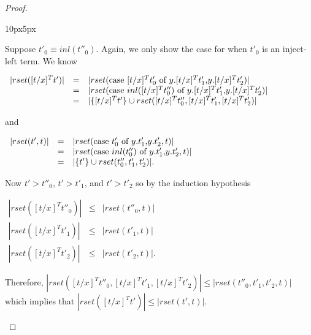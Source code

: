 \begin{proof}
\begin{changemargin}{10px}{5px}
\begin{itemize}
  Suppose $t'_0 \equiv inl(t''_0)$.  Again, we only show the case for when $t'_0$ is an inject-left term.
  We know 
  \begin{center}
    \begin{math}
      \begin{array}{lll}
        |rset([t/x]^T t')| & = & |rset(\mbox{case}\ [t/x]^T t'_0\ \text{of}\ y\text{.}[t/x]^T t'_1\text{,}y\text{.}[t/x]^T t'_2)|\\
        & = & |rset(\mbox{case}\ inl([t/x]^T t''_0)\ \text{of}\ y\text{.}[t/x]^T t'_1\text{,}y\text{.}[t/x]^T t'_2)|\\
        & = & |\{[t/x]^T t'\} \cup rset([t/x]^T t''_0, [t/x]^T t'_1, [t/x]^T t'_2)|
      \end{array}
    \end{math}
  \end{center}
  and
  \begin{center}
    \begin{math}
      \begin{array}{lll}
        |rset(t',t)| & = & |rset(\mbox{case}\ t'_0\ \text{of}\ y\text{.}t'_1\text{,}y\text{.}t'_2,t)|\\
        & = & |rset(\mbox{case}\ inl(t''_0)\ \text{of}\ y\text{.}t'_1\text{,}y\text{.}t'_2,t)|\\
        & = & |\{t'\} \cup rset(t''_0, t'_1,t'_2)|.
      \end{array}
    \end{math}
  \end{center}
  Now $t' > t''_0$, $t' > t'_1$, and $t' > t'_2$ so by the induction hypothesis
  \begin{center}
    \begin{math}
      \begin{array}{lll}
        |rset([t/x]^T t''_0)| & \leq & |rset(t''_0,t)|\\
        |rset([t/x]^T t'_1)|  & \leq & |rset(t'_1,t)|\\
        |rset([t/x]^T t'_2)|  & \leq & |rset(t'_2,t)|.
      \end{array}
    \end{math}
  \end{center}
  Therefore, $|rset([t/x]^T t''_0, [t/x]^T t'_1, [t/x]^T t'_2)| \leq |rset(t''_0, t'_1, t'_2, t)|$
  which implies that $|rset([t/x]^T t')| \leq |rset(t',t)|$.


\end{itemize}
\end{changemargin}
\end{proof}

